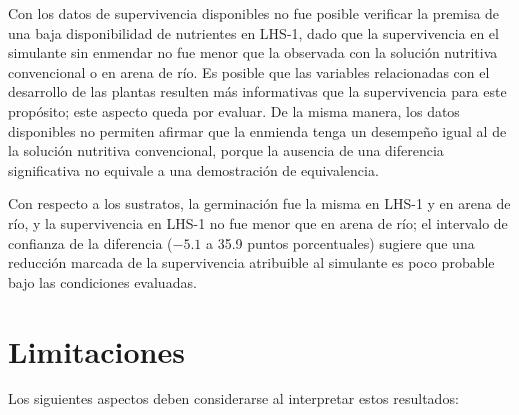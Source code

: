 \documentclass[11pt]{article}
\begin{document}
Con los datos de supervivencia disponibles no fue posible verificar la premisa de una baja disponibilidad de nutrientes en LHS-1, dado que la supervivencia en el simulante sin enmendar no fue menor que la observada con la solución nutritiva convencional o en arena de río. Es posible que las variables relacionadas con el desarrollo de las plantas resulten más informativas que la supervivencia para este propósito; este aspecto queda por evaluar. De la misma manera, los datos disponibles no permiten afirmar que la enmienda tenga un desempeño igual al de la solución nutritiva convencional, porque la ausencia de una diferencia significativa no equivale a una demostración de equivalencia.

Con respecto a los sustratos, la germinación fue la misma en LHS-1 y en arena de río, y la supervivencia en LHS-1 no fue menor que en arena de río; el intervalo de confianza de la diferencia ($-5.1$ a 35.9 puntos porcentuales) sugiere que una reducción marcada de la supervivencia atribuible al simulante es poco probable bajo las condiciones evaluadas.

\section{Limitaciones}

Los siguientes aspectos deben considerarse al interpretar estos resultados:
\end{document}
